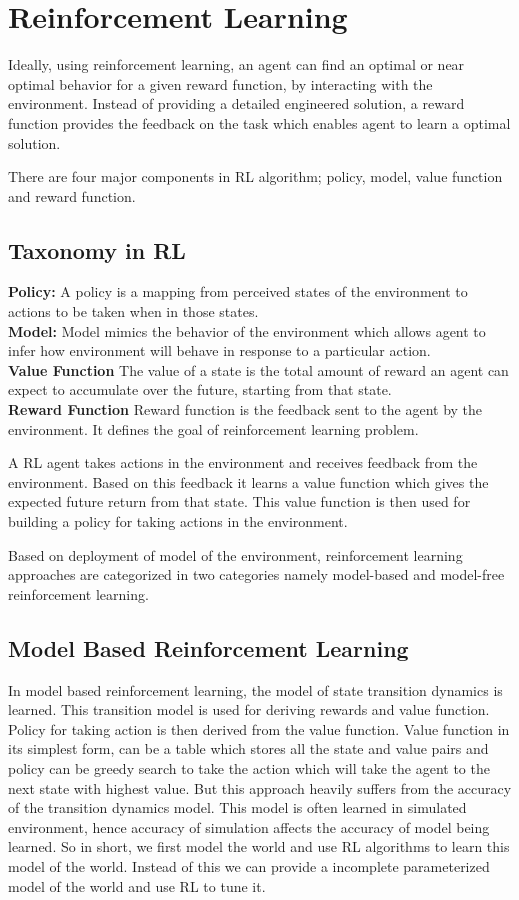\documentclass[thesis]{mas_proposal}
\begin{document}
\section{Reinforcement Learning}

Ideally, using reinforcement learning, an agent can find an optimal or near optimal behavior for a given reward function, by interacting with the environment. Instead of providing a detailed engineered solution, a reward function provides the feedback on the task which enables agent to learn a optimal solution.  

There are four major components in RL algorithm; policy, model, value function and reward function.

\subsection{Taxonomy in RL}

\textbf{Policy:}
A policy is a mapping from perceived states of the environment to actions to be taken when in those states. \\
\textbf{Model:}
Model mimics the behavior of the environment which allows agent to infer how environment will behave in response to a particular action. \\
\textbf{Value Function}
The value of a state is the total amount of reward an agent can expect to accumulate over the future, starting from that state. \\
\textbf{Reward Function}
Reward function is the feedback sent to the agent by the environment. It defines the goal of reinforcement learning problem.

A RL agent takes actions in the environment and receives feedback from the environment. Based on this feedback it learns a value function which gives the expected future return from that state. This value function is then used for building a policy for taking actions in the environment. 

Based on deployment of model of the environment, reinforcement learning approaches are categorized in two categories namely model-based and model-free reinforcement learning.


\subsection{Model Based Reinforcement Learning} \label{mod-RL}
In model based  reinforcement learning, the model of state transition dynamics is learned. This transition model is used for deriving rewards and value function. Policy for taking action is then derived from the value function. Value function in its simplest form, can be a table which stores all the state and value pairs and policy can be greedy search to take the action which will take the agent to the next state with highest value. But this approach heavily suffers from the accuracy of the transition dynamics model. This model is often learned in simulated environment, hence accuracy of simulation affects the accuracy of model being learned. So in short, we first model the world and use RL algorithms to learn this model of the world. Instead of this we can provide a incomplete parameterized model of the world and use RL to tune it.  
\end{document}
